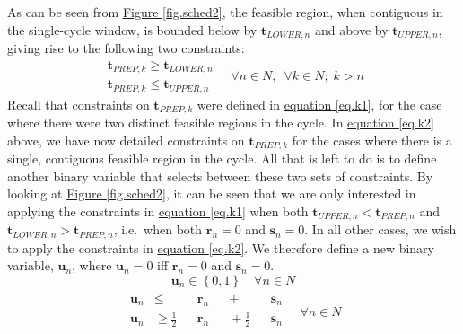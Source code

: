 As can be seen from \hyperref[fig.sched2]{Figure \ref*{fig.sched2}},
the feasible region, when contiguous in the single-cycle window,
is bounded below by $\boldsymbol{t}_{\mathit{LOWER},n}$ and above by
$\boldsymbol{t}_{\mathit{UPPER},n}$, giving rise to the following two
constraints:
\begin{equation}
    \begin{split}
        \boldsymbol{t}_{\mathit{PREP},k} 
        \ge \boldsymbol{t}_{\mathit{LOWER},n}\\
        \boldsymbol{t}_{\mathit{PREP},k} 
        \le \boldsymbol{t}_{\mathit{UPPER},n}
    \end{split}
    \quad \forall n \in N, \enspace \forall k \in N; \; k > n
    \label{eq.k2}
\end{equation}
Recall that constraints on $\boldsymbol{t}_{\mathit{PREP},k}$ were defined in
\hyperref[eq.k1]{equation \ref*{eq.k1}}, for the case where there were two
distinct feasible regions in the cycle.
In \hyperref[eq.k2]{equation \ref*{eq.k2}} above, we have now detailed
constraints on $\boldsymbol{t}_{\mathit{PREP},k}$ for the cases where there is
a single, contiguous feasible region in the cycle.
All that is left to do is to define another binary variable that selects
between these two sets of constraints.
By looking at \hyperref[fig.sched2]{Figure \ref*{fig.sched2}}, it can be seen
that we are only interested in applying the constraints in 
\hyperref[eq.k1]{equation \ref*{eq.k1}} when both
$\boldsymbol{t}_{\mathit{UPPER},n} < \boldsymbol{t}_{\mathit{PREP},n}$ and
$\boldsymbol{t}_{\mathit{LOWER},n} > \boldsymbol{t}_{\mathit{PREP},n}$, i.e.\
when both $\boldsymbol{r}_{n} = 0$ and $\boldsymbol{s}_{n} = 0$.
In all other cases, we wish to apply the constraints in
\hyperref[eq.k2]{equation \ref*{eq.k2}}.
We therefore define a new binary variable, $\boldsymbol{u}_{n}$, where 
$\boldsymbol{u}_{n} = 0$ iff $\boldsymbol{r}_{n} = 0$ and 
$\boldsymbol{s}_{n} = 0$.
\begin{equation}
    \boldsymbol{u}_{n} \in \left\{ 0, 1 \right\} \quad \forall n \in N
    \label{eq.u}
\end{equation}
\begin{equation}
    \begin{split}
        \begin{alignedat}{8}
            \boldsymbol{u}_{n} &\le &&\boldsymbol{r}_{n}
            && {}+{} &&\boldsymbol{s}_{n}\\
            \boldsymbol{u}_{n} &\ge \tfrac{1}{2} &&\boldsymbol{r}_{n}
            && {}+{} \tfrac{1}{2} &&\boldsymbol{s}_{n}\\
        \end{alignedat}
        \quad \forall n \in N
    \end{split}
    \label{eq.u1}
\end{equation}
